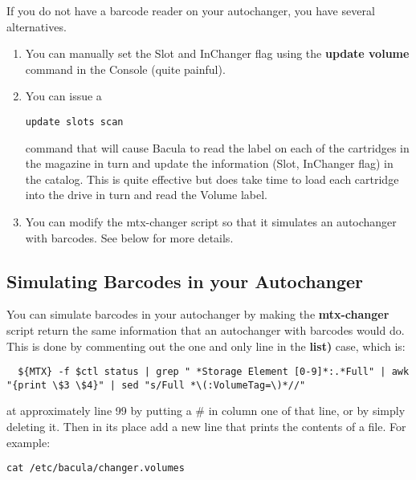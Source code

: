 If you do not have a barcode reader on your autochanger, you have several
alternatives. 

\begin{enumerate}
\item You can manually set the Slot and InChanger flag using  the {\bf update
   volume} command in the Console (quite  painful). 
\item You can issue a 

   \footnotesize
\begin{verbatim}
update slots scan
\end{verbatim}
\normalsize

   command that will cause Bacula to read the label on each  of the cartridges in
   the magazine in turn and update the  information (Slot, InChanger flag) in the
   catalog. This  is quite effective but does take time to load each cartridge 
   into the drive in turn and read the Volume label.  
\item You can modify the mtx-changer script so that it simulates  an
   autochanger with barcodes. See below for more details. 
   \end{enumerate}

\label{simulating}

\subsection*{Simulating Barcodes in your Autochanger}

You can simulate barcodes in your autochanger by making the {\bf mtx-changer}
script return the same information that an autochanger with barcodes would do.
This is done by commenting out the one and only line in the {\bf list)} case,
which is: 

\footnotesize
\begin{verbatim}
  ${MTX} -f $ctl status | grep " *Storage Element [0-9]*:.*Full" | awk "{print \$3 \$4}" | sed "s/Full *\(:VolumeTag=\)*//"
\end{verbatim}
\normalsize

at approximately line 99 by putting a \# in column one of that line, or by
simply deleting it. Then in its place add a new line that prints the contents
of a file. For example: 

\footnotesize
\begin{verbatim}
cat /etc/bacula/changer.volumes
\end{verbatim}
\normalsize

